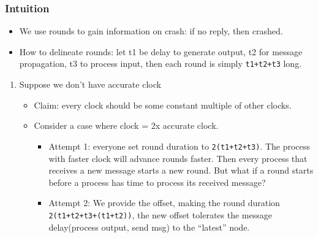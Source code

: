 \documentclass[11pt]{article}
\begin{document}
\subsubsection{Intuition}
\label{sec:orgb33bfff}
\begin{itemize}
\item We use rounds to gain information on crash: if no reply, then crashed.
\item How to delineate rounds: let t1 be delay to generate output, t2 for message
propagation, t3 to process input, then each round is simply \texttt{t1+t2+t3} long.
\end{itemize}
\begin{enumerate}
\item Suppose we don't have accurate clock
\label{sec:org68cd948}
\begin{itemize}
\item Claim: every clock should be some constant multiple of other clocks.
\item Consider a case where clock = 2x accurate clock.
\begin{itemize}
\item Attempt 1: everyone set round duration to \texttt{2(t1+t2+t3)}. The process with
faster clock will advance rounds faster. Then every process that receives a
new message starts a new round. But what if a round starts before a process
has time to process its received message?
\item Attempt 2: We provide the offset, making the round duration
\texttt{2(t1+t2+t3+(t1+t2))}, the new offset tolerates the message delay(process
output, send msg) to the ``latest'' node.
\end{itemize}
\end{itemize}
\end{enumerate}
\end{document}
